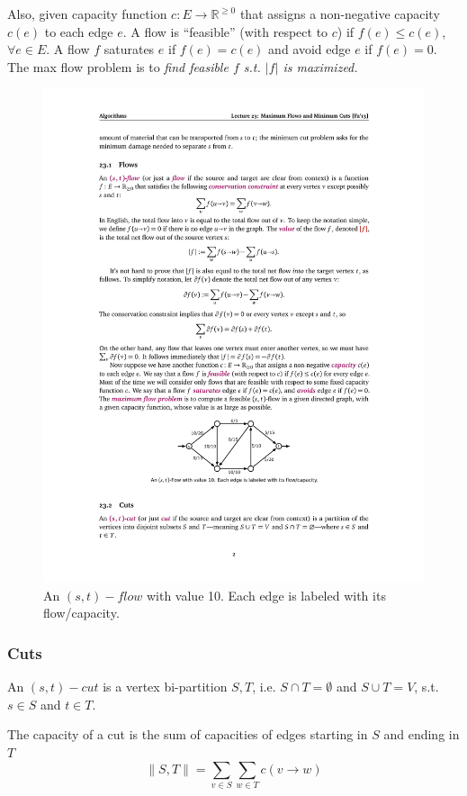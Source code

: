 Also, given capacity function $c:E \rightarrow \mathbb{R}^{\geq 0}$
that assigns a non-negative capacity $c(e)$ to each edge $e$.
A flow is ``feasible'' (with respect to $c$) if
$f(e) \leq c(e)$, $\forall e \in E$.
A flow $f$ saturates $e$ if $f(e) = c(e)$ and avoid edge $e$ if $f(e) = 0$.
The max flow problem is to \emph{find feasible $f$ s.t. $|f|$ is maximized.}
\begin{figure}[H]
    \centering
    \includegraphics[scale=1.5]{fig/flowExample}
    \caption{An $(s,t)-flow$ with value 10. Each edge is labeled with its flow/capacity.}
    \label{fig:flowExample}
\end{figure}

\subsubsection{Cuts}
An $(s,t)-cut$ is a vertex bi-partition $S,T$,
i.e. $S \cap T = \emptyset$ and $S \cup T = V$, s.t. $s \in S$ and $t \in T$.

The capacity of a cut is the sum of capacities of edges
starting in $S$ and ending in $T$
\[ \|S,T\| = \sum_{v \in S}\sum_{w \in T} c(v \rightarrow w)\]

